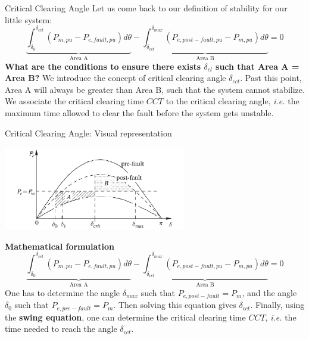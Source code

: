 \begin{frame} {Critical Clearing Angle}
Let us come back to our definition of stability for our little system:
$$\underbrace{\int_{\delta_0}^{\delta_{cct}} \left(P_{m,pu}-P_{e,fault,pu}\right) d\theta}_{\text{Area A}} - \underbrace{\int_{\delta_{cct}}^{\delta_{max}} \left(P_{e,post-fault,pu}-P_{m,pu}\right) d\theta}_{\text{Area B}} = 0$$
\textbf{What are the conditions to ensure there exists $\delta_{cl}$ such that Area A = Area B?}
We introduce the concept of critical clearing angle $\delta_{cct}$. Past this point, Area A will always be greater than Area B, such that the system cannot stabilize. We associate the critical clearing time $CCT$ to the critical clearing angle, \emph{i.e.} the maximum time allowed to clear the fault before the system gets unstable.
\end{frame}

\begin{frame} {Critical Clearing Angle: Visual representation}
\begin{center}
\includegraphics[width=0.6\textwidth]{images/CCT_example.png}
\end{center}
\textbf{Mathematical formulation}
$$\underbrace{\int_{\delta_0}^{\delta_{cct}} \left(P_{m,pu}-P_{e,fault,pu}\right) d\theta}_{\text{Area A}} - \underbrace{\int_{\delta_{cct}}^{\delta_{max}} \left(P_{e,post-fault,pu}-P_{m,pu}\right) d\theta}_{\text{Area B}} = 0$$
One has to determine the angle $\delta_{max}$ such that $P_{e,post-fault} = P_{m}$, and the angle $\delta_{0}$ such that $P_{e,pre-fault} = P_{m}$. Then solving this equation gives $\delta_{cct}$. Finally, using the \textbf{swing equation}, one can determine the critical clearing time $CCT$, \emph{i.e.} the time needed to reach the angle $\delta_{cct}$.
\end{frame}

